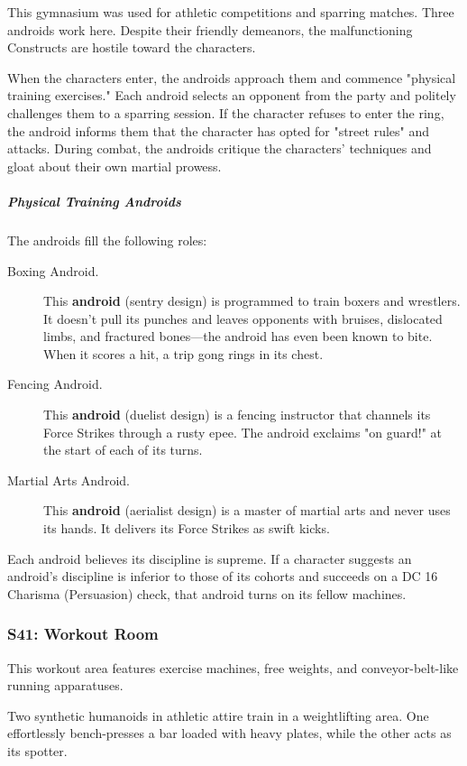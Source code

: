 \documentclass[10pt,a4paper,twoside,bg=print,twocolumn,openany,nodeprecatedcode]{dndbook}
\begin{document}
This gymnasium was used for athletic competitions and sparring matches. Three androids work here. Despite their friendly demeanors, the malfunctioning Constructs are hostile toward the characters.

When the characters enter, the androids approach them and commence "physical training exercises." Each android selects an opponent from the party and politely challenges them to a sparring session. If the character refuses to enter the ring, the android informs them that the character has opted for "street rules" and attacks. During combat, the androids critique the characters' techniques and gloat about their own martial prowess.

\subparagraph{Physical Training Androids}
The androids fill the following roles:


\begin{description}
\item[Boxing Android.]
This \textbf{android} (sentry design) is programmed to train boxers and wrestlers. It doesn't pull its punches and leaves opponents with bruises, dislocated limbs, and fractured bones—the android has even been known to bite. When it scores a hit, a trip gong rings in its chest.
\item[Fencing Android.]
This \textbf{android} (duelist design) is a fencing instructor that channels its Force Strikes through a rusty epee. The android exclaims "on guard!" at the start of each of its turns.
\item[Martial Arts Android.]
This \textbf{android} (aerialist design) is a master of martial arts and never uses its hands. It delivers its Force Strikes as swift kicks.
\end{description}

Each android believes its discipline is supreme. If a character suggests an android's discipline is inferior to those of its cohorts and succeeds on a DC 16 Charisma (Persuasion) check, that android turns on its fellow machines.

\subsubsection{S41: Workout Room}
\begin{DndReadAloud}{}
This workout area features exercise machines, free weights, and conveyor-belt-like running apparatuses.

Two synthetic humanoids in athletic attire train in a weightlifting area. One effortlessly bench-presses a bar loaded with heavy plates, while the other acts as its spotter.

\end{DndReadAloud}
\end{document}
